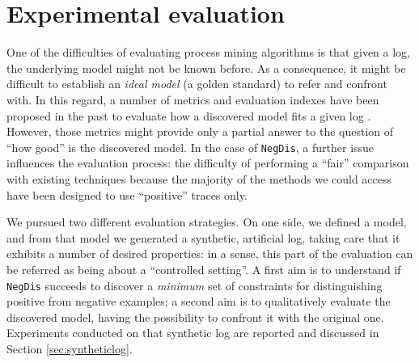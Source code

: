 \documentclass[a4wide,11pt]{article}
\theoremstyle{definition}
\theoremstyle{plain}
\newcommand{\nd}{\texttt{NegDis}\xspace}
\begin{document}

\newcommand{\todoinfc}[1]{\todo[inline,backgroundcolor=yellow]{FC: #1}}



\section{Experimental evaluation}
\label{sec:eval}


One of the difficulties of evaluating process mining algorithms is that given a log, the underlying model might not be known before. As a consequence, it might be difficult to establish an \emph{ideal model} (a golden standard) to refer and confront with. In this regard, a number of metrics and evaluation indexes have been proposed in the past to evaluate how a discovered model fits a given log \cite{2015-Adriansyah,2014-Broucke,2018-Ponce}. However, those metrics might provide only a partial answer to the question of ``how good'' is the discovered model. 
%
In the case of \nd, a further issue influences the evaluation process: the difficulty of performing a ``fair'' comparison with existing techniques because the majority of the methods we could access have been designed to use ``positive'' traces only.



We pursued two different evaluation strategies. On one side, we defined a model, and from that model we generated a synthetic, artificial log, taking care that it exhibits a number of desired properties: in a sense, this part of the evaluation can be referred as being about a ``controlled setting''. A first aim is to understand if \nd succeeds to discover a \emph{minimum} set of constraints for distinguishing positive from negative examples; a second aim is to qualitatively evaluate the discovered model, having the possibility to confront it with the original one. Experiments conducted on that synthetic log are reported and discussed in Section \ref{sec:syntheticlog}.
\end{document}
